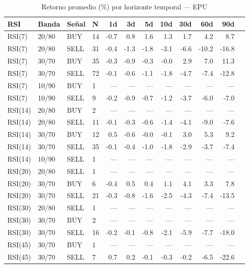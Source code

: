 %
\begin{table}[htbp]
    \centering
    \caption{Retorno promedio (\%) por horizonte temporal --- EPU}
    \label{tab:media_epu}
    \small
    \begin{tabular}{llllrrrrrrrr}
        \toprule
        \textbf{RSI} & \textbf{Banda} & \textbf{Se\~{n}al} & \textbf{N} & \textbf{1d} & \textbf{3d} & \textbf{5d} & \textbf{10d} & \textbf{30d} & \textbf{60d} & \textbf{90d} \\
        \midrule
        RSI(7) & 20/80 & BUY & 14 & -0.7 & 0.8 & 1.6 & 1.3 & 1.7 & 4.2 & 8.7 \\
        RSI(7) & 20/80 & SELL & 31 & -0.4 & -1.3 & -1.8 & -3.1 & -6.6 & -10.2 & -16.8 \\
        RSI(7) & 30/70 & BUY & 35 & -0.3 & -0.9 & -0.3 & -0.0 & 2.9 & 7.0 & 11.3 \\
        RSI(7) & 30/70 & SELL & 72 & -0.1 & -0.6 & -1.1 & -1.8 & -4.7 & -7.4 & -12.8 \\
        RSI(7) & 10/90 & BUY & 1 & --- & --- & --- & --- & --- & --- & --- \\
        RSI(7) & 10/90 & SELL & 9 & -0.2 & -0.9 & -0.7 & -1.2 & -3.7 & -6.0 & -7.0 \\
        \midrule
        RSI(14) & 20/80 & BUY & 2 & --- & --- & --- & --- & --- & --- & --- \\
        RSI(14) & 20/80 & SELL & 11 & -0.1 & -0.3 & -0.6 & -1.4 & -4.1 & -9.0 & -7.6 \\
        RSI(14) & 30/70 & BUY & 12 & 0.5 & -0.6 & -0.0 & -0.1 & 3.0 & 5.3 & 9.2 \\
        RSI(14) & 30/70 & SELL & 35 & -0.1 & -0.4 & -1.0 & -1.8 & -2.9 & -3.7 & -7.4 \\
        RSI(14) & 10/90 & SELL & 1 & --- & --- & --- & --- & --- & --- & --- \\
        \midrule
        RSI(20) & 20/80 & SELL & 1 & --- & --- & --- & --- & --- & --- & --- \\
        RSI(20) & 30/70 & BUY & 6 & -0.4 & 0.5 & 0.4 & 1.1 & 4.1 & 3.3 & 7.8 \\
        RSI(20) & 30/70 & SELL & 21 & -0.3 & -0.8 & -1.6 & -2.5 & -4.3 & -7.4 & -13.5 \\
        \midrule
        RSI(30) & 20/80 & SELL & 1 & --- & --- & --- & --- & --- & --- & --- \\
        RSI(30) & 30/70 & BUY & 2 & --- & --- & --- & --- & --- & --- & --- \\
        RSI(30) & 30/70 & SELL & 16 & -0.2 & -0.1 & -0.8 & -2.1 & -5.9 & -7.7 & -18.0 \\
        \midrule
        RSI(45) & 30/70 & BUY & 1 & --- & --- & --- & --- & --- & --- & --- \\
        RSI(45) & 30/70 & SELL & 7 & 0.7 & 0.2 & -0.1 & -0.3 & -0.2 & -6.5 & -22.6 \\
        \bottomrule
    \end{tabular}
\end{table}
